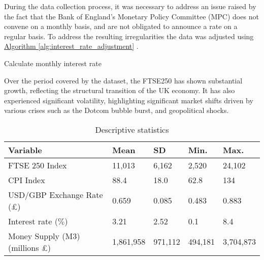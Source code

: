 \documentclass[11pt,a4paper]{article}
\newcommand{\algoref}[1]{%
    \hyperref[alg:#1]{Algorithm \ref{alg:#1}}%
}
\begin{document}
During the data collection process, it was necessary to address an issue raised by the fact that the Bank of England’s Monetary Policy Committee (MPC) 
does not convene on a monthly basis, and are not obligated to 
announce a rate on a regular basis. To address the resulting irregularities the data was adjusted using \algoref{interest_rate_adjustment}.


\begin{algorithm}[H]
    \caption{Calculate monthly interest rate}
    \label{alg:interest_rate_adjustment}
    
\end{algorithm}


Over the period covered by the dataset, the FTSE250 has 
shown substantial growth, reflecting the structural transition of the UK economy.
It has also experienced significant volatility, highlighting significant market shifts driven by 
various crises such as the Dotcom bubble burst, and geopolitical shocks.

\begin{table}[h!]
    \centering
    \caption{Descriptive statistics}
    \begin{tabular}{lllll}
        \toprule
        \textbf{Variable} & \textbf{Mean} & \textbf{SD} &  \textbf{Min.} & \textbf{Max.}\\
        \midrule
        FTSE 250 Index &  11,013 & 6,162 & 2,520 & 24,102 \\
        CPI Index &  88.4 & 18.0 & 62.8 & 134 \\
        USD/GBP Exchange Rate (£) &  0.659 & 0.085 & 0.483 & 0.883 \\
        Interest rate ($\%$) &  3.21 & 2.52 & 0.1 & 8.4 \\
        Money Supply (M3) (millions £) &  1,861,958 & 971,112 & 494,181 & 3,704,873 \\
        \bottomrule
    \end{tabular}
\end{table}
\end{document}
